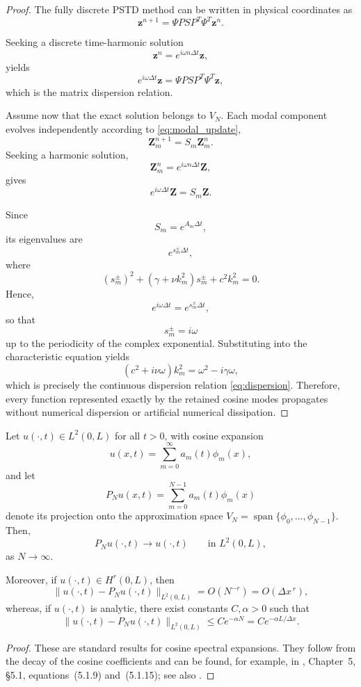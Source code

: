\documentclass{Configuration_Files/PoliMi3i_thesis}
\begin{document}
\begin{proof}
The fully discrete PSTD method can be written in physical coordinates as
\[
\mathbf z^{n+1}
=
\Psi
P
S
P^T
\Psi^T
\mathbf z^n.
\]

Seeking a discrete time-harmonic solution
\[
\mathbf z^n
=
e^{i\omega n\Delta t}\mathbf z,
\]
yields
\[
e^{i\omega\Delta t}\mathbf z
=
\Psi
P
S
P^T
\Psi^T
\mathbf z,
\]
which is the matrix dispersion relation.

Assume now that the exact solution belongs to $V_N$.
Each modal component evolves independently according to
\eqref{eq:modal_update},
\[
\mathbf Z_m^{n+1}
=
S_m\mathbf Z_m^n.
\]
Seeking a harmonic solution,
\[
\mathbf Z_m^n
=
e^{i\omega n\Delta t}\mathbf Z,
\]
gives
\[
e^{i\omega\Delta t}\mathbf Z
=
S_m\mathbf Z.
\]

Since
\[
S_m=e^{A_m\Delta t},
\]
its eigenvalues are
\[
e^{s_m^\pm\Delta t},
\]
where
\[
(s_m^\pm)^2
+
(\gamma+\nu k_m^2)s_m^\pm
+
c^2k_m^2
=
0.
\]
Hence,
\[
e^{i\omega\Delta t}
=
e^{s_m^\pm\Delta t},
\]
so that
\[
s_m^\pm=i\omega
\]
up to the periodicity of the complex exponential. Substituting into the characteristic equation yields
\[
(c^2+i\nu\omega)k_m^2
=
\omega^2-i\gamma\omega,
\]
which is precisely the continuous dispersion relation \eqref{eq:dispersion}. Therefore, every function represented exactly by the retained cosine modes propagates without numerical dispersion or artificial numerical dissipation.
\end{proof}

\begin{proposition} \label{prop:cosine_approximation_convergence}
Let $u(\cdot,t) \in L^2(0,L)$ for all $t > 0$, with cosine expansion
\[
u(x,t)
=
\sum_{m=0}^{\infty}
a_m(t)\phi_m(x),
\]
and let
\[
P_N u(x,t)
=
\sum_{m=0}^{N-1}
a_m(t)\phi_m(x)
\]
denote its projection onto the approximation space $V_N = \operatorname{span}\{\phi_0,\ldots,\phi_{N-1}\}$.
Then,
\[
P_N u(\cdot,t)\longrightarrow u(\cdot,t)
\qquad\text{in }L^2(0,L),
\]
as $N\rightarrow\infty$.

Moreover, if $u(\cdot,t)\in H^r(0,L)$, then
\[
\|u(\cdot,t)-P_N u(\cdot,t)\|_{L^2(0,L)}
=
O(N^{-r})
=
O(\Delta x^{\,r}),
\]
whereas, if $u(\cdot,t)$ is analytic, there exist constants $C,\alpha>0$ such that
\[
\|u(\cdot,t)-P_N u(\cdot,t)\|_{L^2(0,L)}
\le
Ce^{-\alpha N}
=
Ce^{-\alpha L/\Delta x}.
\]
\end{proposition}

\begin{proof}
These are standard results for cosine spectral expansions. They follow from the decay of the cosine coefficients and can be found, for example, in \cite{canuto_spectral_2006}, Chapter~5, \S5.1, equations~(5.1.9) and~(5.1.15); see also \cite{quarteroni_numerical_2007}.
\end{proof}
\end{document}
